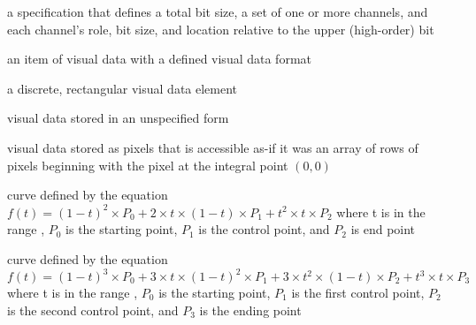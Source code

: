 %
a specification that defines a total bit size, a set of one or more channels, and each channel's role, bit size, and location relative to the upper (high-order) bit

%
an item of visual data with a defined visual data format

a discrete, rectangular visual data element

%
 visual data stored in an unspecified form

%
%
 visual data stored as pixels that is accessible as-if it was an array of rows of pixels beginning with the pixel at the integral point $(0,0)$

%
%
 curve defined by the 
equation $f(t) = (1 - t)^{2} \times P_{0} + 2 \times t \times (1 - t) 
\times P_{1} + t^{2} \times t \times P_{2}$ where t is in the range , $P_{0}$ is the starting point, $P_{1}$ is the 
control point, and $P_{2}$ is end point

 curve defined by the 
equation $f(t) = (1 - t)^{3} \times P_{0} + 3 \times t \times (1 - t)^{2} 
\times P_{1} + 3 \times t^{2} \times (1 - t) \times P_{2} + t^{3} \times t 
\times P_{3}$ where t is in the range , $P_{0}$ is the starting point, $P_{1}$ is the first control point, $P_{2}$ is the second control point, and $P_{3}$ is the ending point

